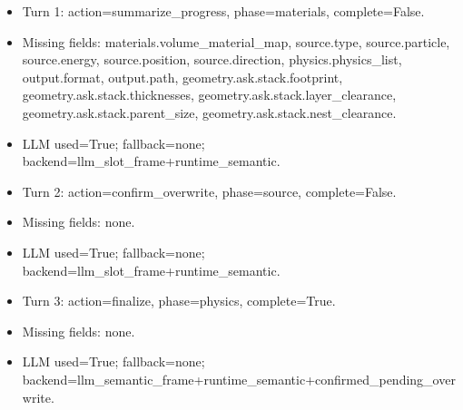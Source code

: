 \documentclass[11pt]{ctexart}
\begin{document}
\begin{itemize}
\item Turn 1: action=summarize\_progress, phase=materials, complete=False.
\item Missing fields: materials.volume\_material\_map, source.type, source.particle, source.energy, source.position, source.direction, physics.physics\_list, output.format, output.path, geometry.ask.stack.footprint, geometry.ask.stack.thicknesses, geometry.ask.stack.layer\_clearance, geometry.ask.stack.parent\_size, geometry.ask.stack.nest\_clearance.
\item LLM used=True; fallback=none; backend=llm\_slot\_frame+runtime\_semantic.
\item Turn 2: action=confirm\_overwrite, phase=source, complete=False.
\item Missing fields: none.
\item LLM used=True; fallback=none; backend=llm\_slot\_frame+runtime\_semantic.
\item Turn 3: action=finalize, phase=physics, complete=True.
\item Missing fields: none.
\item LLM used=True; fallback=none; backend=llm\_semantic\_frame+runtime\_semantic+confirmed\_pending\_overwrite.
\end{itemize}
\end{document}
